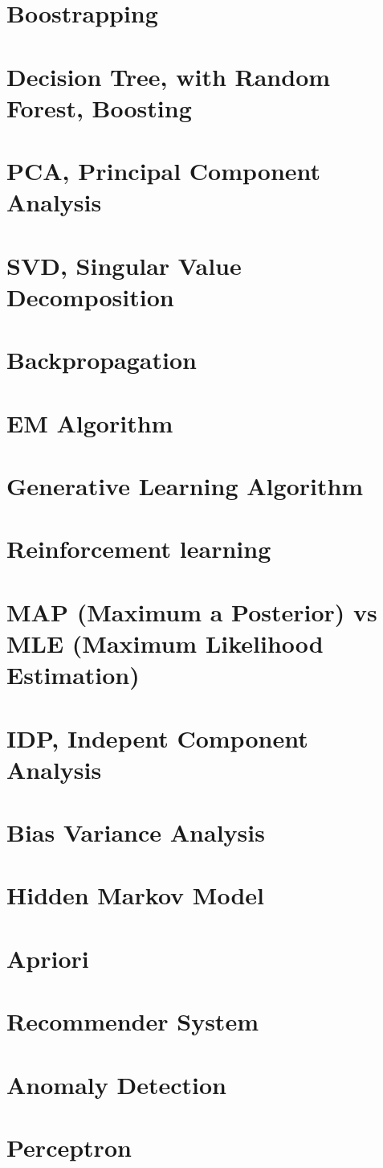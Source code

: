 \documentclass{article}
\begin{document}
\section{Boostrapping} 
\section{Decision Tree, with Random Forest, Boosting}
\section{PCA, Principal Component Analysis}
\section{SVD, Singular Value Decomposition}
\section{Backpropagation}
\section{EM Algorithm}
\section{Generative Learning Algorithm}
\section{Reinforcement learning}
\section{MAP (Maximum a Posterior) vs MLE (Maximum Likelihood Estimation)} 
\section{IDP, Indepent Component Analysis}
\section{Bias Variance Analysis} 
\section{Hidden Markov Model}
\section{Apriori}
\section{Recommender System}
\section{Anomaly Detection} 
\section{Perceptron}
\end{document}
